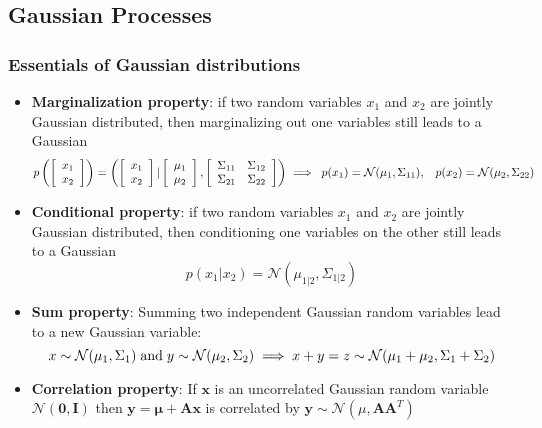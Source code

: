 \subsection{Gaussian Processes}
\subsubsection{Essentials of Gaussian distributions}
\begin{itemize}
	\item \textbf{Marginalization property}: if two random variables $x_1$ and $x_2$ are jointly Gaussian distributed, then marginalizing out one variables still leads to a Gaussian
	$$p\left(\left[\begin{array}{c}
	x_1 \\ x_2
	\end{array}\right]\right) = \left(\left[\begin{array}{c}
	x_1\\x_2
	\end{array}\right]|\left[\begin{array}{c}
	\mu_1\\\mu_2
	\end{array}\right], \left[\begin{array}{cc}
	\Sigma_{11} & \Sigma_{12} \\ \Sigma_{21} & \Sigma_{22} 
	\end{array}\right]\right)\implies\hspace{1mm} p(x_1) = \mathcal{N}(\mu_1, \Sigma_{11}),\hspace{3mm} p(x_2) = \mathcal{N}(\mu_2, \Sigma_{22})$$
	\item \textbf{Conditional property}: if two random variables $x_1$ and $x_2$ are jointly Gaussian distributed, then conditioning one variables on the other still leads to a Gaussian
	$$p(x_1|x_2) = \mathcal{N}(\mu_{1|2}, \Sigma_{1|2})$$
	\item \textbf{Sum property}: Summing two independent Gaussian random variables lead to a new Gaussian variable:
	$$x\sim \mathcal{N}(\mu_1, \Sigma_1) \text{\hspace{1mm}and\hspace{1mm}} y\sim \mathcal{N}(\mu_2, \Sigma_2) \implies x+y=z\sim\mathcal{N}(\mu_1+\mu_2, \Sigma_1+\Sigma_2) $$ 
	\item \textbf{Correlation property}: If $\bm{x}$ is an uncorrelated Gaussian random variable $\mathcal{N}(\bm{0}, \bm{I})$ then $\bm{y} = \bm{\mu} + \bm{A}\bm{x}$ is correlated by $\bm{y}\sim\mathcal{N}(\mu, \bm{A}\bm{A}^T)$
\end{itemize}
